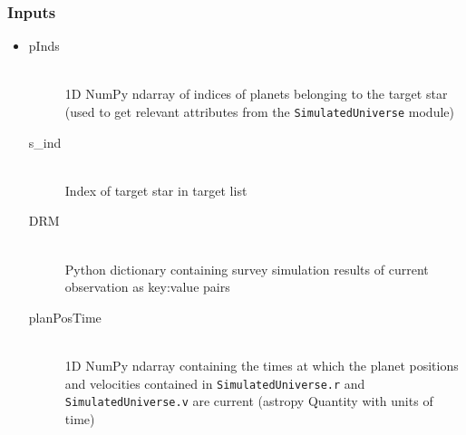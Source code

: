 \documentclass[cleanfoot]{asme2ej}
\begin{document}
\subsubsection*{Inputs}
\begin{itemize}
    \item 
    \begin{description}
        \item[pInds] \hfill \\
        1D NumPy ndarray of indices of planets belonging to the target star (used to get relevant attributes from the \verb+SimulatedUniverse+ module)
        \item[s\_ind] \hfill \\
        Index of target star in target list
        \item[DRM] \hfill \\
        Python dictionary containing survey simulation results of current observation as key:value pairs
        \item[planPosTime] \hfill \\
        1D NumPy ndarray containing the times at which the planet positions and velocities contained in \verb+SimulatedUniverse.r+ and \verb+SimulatedUniverse.v+ are current (astropy Quantity with units of time)
    \end{description}
\end{itemize}
\end{document}
